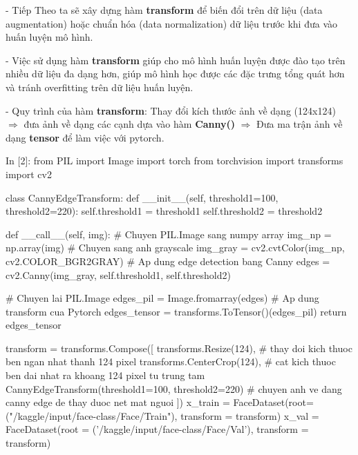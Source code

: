 \documentclass[12pt, a4paper]{article}
\begin{document}
\par - Tiếp Theo ta sẽ xây dựng hàm \textbf{transform}  để biến đổi trên dữ liệu (data augmentation) hoặc chuẩn hóa (data normalization) dữ liệu trước khi đưa vào huấn luyện mô hình.
\par - Việc sử dụng hàm \textbf{transform} giúp cho mô hình huấn luyện được đào tạo trên nhiều dữ liệu đa dạng hơn, giúp mô hình học được các đặc trưng tổng quát hơn và tránh overfitting trên dữ liệu huấn luyện.
\par - Quy trình của hàm \textbf{transform}: Thay đổi kích thước ảnh về dạng (124x124) $\Rightarrow$ đưa ảnh về dạng các cạnh dựa vào hàm \textbf{Canny()} $\Rightarrow$ Đưa ma trận ảnh về dạng \textbf{tensor} để làm việc  với pytorch.
\begin{python}
In [2]: from PIL import Image
        import torch
        from torchvision import transforms
        import cv2
        
        class CannyEdgeTransform:
            def __init__(self, threshold1=100, threshold2=220):
                self.threshold1 = threshold1
                self.threshold2 = threshold2
                
            def __call__(self, img):
                # Chuyen PIL.Image sang numpy array
                img_np = np.array(img)
                # Chuyen sang anh grayscale
                img_gray = cv2.cvtColor(img_np, cv2.COLOR_BGR2GRAY)
                # Ap dung edge detection bang Canny
                edges = cv2.Canny(img_gray, self.threshold1, self.threshold2)
                
                # Chuyen lai PIL.Image
                edges_pil = Image.fromarray(edges)
                # Ap dung transform cua Pytorch
                edges_tensor = transforms.ToTensor()(edges_pil)
                return edges_tensor
            
            
        transform = transforms.Compose([
            transforms.Resize(124), # thay doi kich thuoc ben ngan nhat thanh 124 pixel             
            transforms.CenterCrop(124), # cat kich thuoc ben dai nhat ra khoang 124 pixel tu trung tam 
            CannyEdgeTransform(threshold1=100, threshold2=220) # chuyen anh ve dang canny edge de thay duoc net mat nguoi
        ])
        x_train = FaceDataset(root=("/kaggle/input/face-class/Face/Train"), transform = transform)
        x_val = FaceDataset(root = ('/kaggle/input/face-class/Face/Val'), transform = transform)
\end{python}
\end{document}
